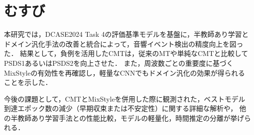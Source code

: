\documentclass[main]{subfiles}
\begin{document}
\section{むすび}
本研究では，DCASE2024 Task 4の評価基準モデルを基盤に，半教師あり学習とドメイン汎化手法の改善と統合によって，音響イベント検出の精度向上を図った． 
結果として，負例を活用したCMTは，従来のMTや単純なCMTと比較してPSDS1あるいはPSDS2を向上させた．
また，周波数ごとの重要度に基づくMixStyleの有効性を再確認し，軽量なCNNでもドメイン汎化の効果が得られることを示した．\par

今後の課題として，CMTとMixStyleを併用した際に観測された，ベストモデル到達エポック数の減少（早期収束または不安定性）に関する詳細な解析や，
他の半教師あり学習手法との性能比較，モデルの軽量化，時間推定の分離が挙げられる．\par
\end{document}
